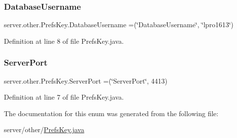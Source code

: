 \subsubsection{\texorpdfstring{Database\+Username}{DatabaseUsername}}
{\footnotesize\ttfamily server.\+other.\+Prefs\+Key.\+Database\+Username =(\char`\"{}Database\+Username\char`\"{}, \char`\"{}lpro1613\char`\"{})}



Definition at line 8 of file Prefs\+Key.\+java.

\hypertarget{enumserver_1_1other_1_1_prefs_key_a97c1897d83b59cf6735643e3b50d549b}{}\label{enumserver_1_1other_1_1_prefs_key_a97c1897d83b59cf6735643e3b50d549b} 
\subsubsection{\texorpdfstring{Server\+Port}{ServerPort}}
{\footnotesize\ttfamily server.\+other.\+Prefs\+Key.\+Server\+Port =(\char`\"{}Server\+Port\char`\"{}, 4413)}



Definition at line 7 of file Prefs\+Key.\+java.



The documentation for this enum was generated from the following file\+:\begin{DoxyCompactItemize}
\item 
server/other/\hyperlink{server_2other_2_prefs_key_8java}{Prefs\+Key.\+java}\end{DoxyCompactItemize}
